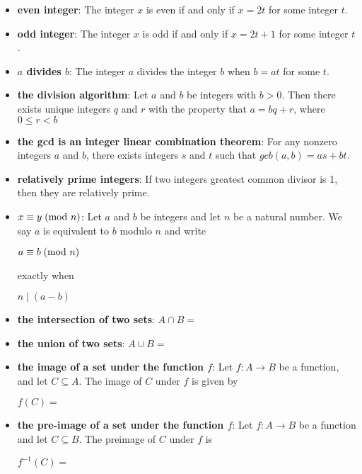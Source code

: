 \documentclass[11pt, oneside]{article}
\begin{document}
\begin{itemize}
\item \textbf{even integer}:  The integer $x$ is even if and only if $x=2t$ for some integer $t$. \vfill
\item \textbf{odd integer}:  The integer $x$ is odd if and only if $x=2t+1$ for some integer $t$.  \vfill 
\item \textbf{$a$ divides $b$}:  The integer $a$ divides the integer $b$ when $b=at$ for some $t$.  \vfill
\item \textbf{the division algorithm}: Let $a$ and $b$ be integers with $b>0$. Then there exists unique integers $q$ and $r$ with the property that $a = bq + r$, where $0\leq r<b$\vfill 
\item \textbf{the gcd is an integer linear combination theorem}:  For any nonzero integers $a$ and $b$, there exists integers $s$ and $t$ such that $gcb(a,b) = as + bt$. \vfill
\item \textbf{relatively prime integers}:  If two integers greatest common divisor is 1, then they are relatively prime.  \vfill 
\item \textbf{$x  \equiv y  \; \mbox{(mod $n$)} $}: Let $a$ and $b$ be integers and let $n$ be a natural number. We say $a$ is equivalent to $b$ modulo $n$ and write  
\begin{center}
$a  \equiv b  \; \mbox{(mod $n$)} $ \end{center}
exactly when 
\begin{center}
$n\mid(a - b)$\vfill \end{center}
\item \textbf{the intersection of two sets}: $A \cap B =$ \textbraceright \vfill
\item \textbf{the union of two sets}: $A \cup B =$ \textbraceright \vfill 
\item \textbf{the image of a set under the function $f$}: Let $f : A\rightarrow B$ be a function, and let $C\subseteq A$. The image of $C$ under $f$ is given by
\begin{center}
    $f(C) =$ \textbraceright
\end{center}\vfill 
\item \textbf{the pre-image of a set under the function $f$}: Let $f : A\rightarrow B$ be a function and let $C\subseteq B$. The preimage of $C$ under $f$ is
\begin{center}
    $f^{-1}(C)=$\textbraceright 
\end{center}\vfill 

\end{itemize}
\end{document}
